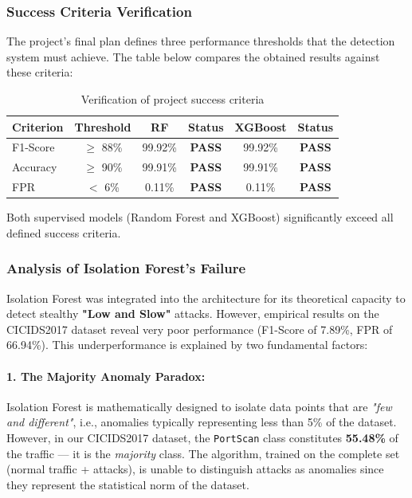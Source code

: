 \subsubsection{Success Criteria Verification}

The project's final plan defines three performance thresholds that the detection system must achieve. The table below compares the obtained results against these criteria:

\begin{table}[H]
\centering
\caption{Verification of project success criteria}
\label{tab:success}
\begin{tabular}{lccccc}
\toprule
\textbf{Criterion} & \textbf{Threshold} & \textbf{RF} & \textbf{Status} & \textbf{XGBoost} & \textbf{Status} \\
\midrule
F1-Score & $\geq$ 88\% & 99.92\% & \textbf{PASS} & 99.92\% & \textbf{PASS} \\
Accuracy & $\geq$ 90\% & 99.91\% & \textbf{PASS} & 99.91\% & \textbf{PASS} \\
FPR & $<$ 6\% & 0.11\% & \textbf{PASS} & 0.11\% & \textbf{PASS} \\
\bottomrule
\end{tabular}
\end{table}

\noindent Both supervised models (Random Forest and XGBoost) significantly exceed all defined success criteria.

\subsubsection{Analysis of Isolation Forest's Failure}

Isolation Forest was integrated into the architecture for its theoretical capacity to detect stealthy \textbf{"Low and Slow"} attacks. However, empirical results on the CICIDS2017 dataset reveal very poor performance (F1-Score of 7.89\%, FPR of 66.94\%). This underperformance is explained by two fundamental factors:

\paragraph{1. The Majority Anomaly Paradox:} Isolation Forest is mathematically designed to isolate data points that are \textit{"few and different"}, i.e., anomalies typically representing less than 5\% of the dataset. However, in our CICIDS2017 dataset, the \texttt{PortScan} class constitutes \textbf{55.48\%} of the traffic — it is the \textit{majority} class. The algorithm, trained on the complete set (normal traffic + attacks), is unable to distinguish attacks as anomalies since they represent the statistical norm of the dataset.

